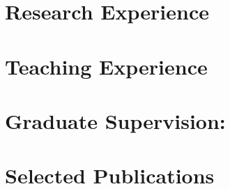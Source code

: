 \documentclass[margin,centered]{res}
\begin{document}
\begin{resume}
\section{\sc Research Experience}




\section{\sc Teaching Experience}




\section{\sc Graduate Supervision:}





% 






\section{\sc Selected Publications}






\end{resume}
\end{document}
